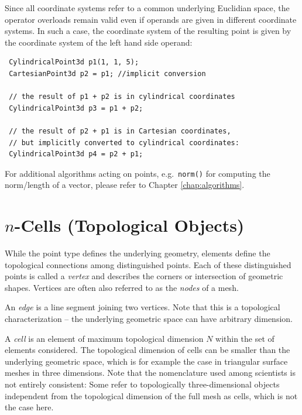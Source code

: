 
Since all coordinate systems refer to a common underlying Euclidian space, the operator overloads remain valid even if operands are given in different coordinate systems. In such a case, the coordinate system of the resulting point is given by the coordinate system of the left hand side operand:
\begin{lstlisting}
 CylindricalPoint3d p1(1, 1, 5);
 CartesianPoint3d p2 = p1; //implicit conversion

 // the result of p1 + p2 is in cylindrical coordinates
 CylindricalPoint3d p3 = p1 + p2;

 // the result of p2 + p1 is in Cartesian coordinates,
 // but implicitly converted to cylindrical coordinates:
 CylindricalPoint3d p4 = p2 + p1;
\end{lstlisting}
For additional algorithms acting on points, e.g.~\lstinline|norm()| for computing the norm/length of a vector, please refer to Chapter \ref{chap:algorithms}.


\section{$n$-Cells (Topological Objects)} \label{sec:ncells}
While the point type defines the underlying geometry, elements define the topological connections among distinguished points. Each of these distinguished points is called a \emph{vertex} and describes the corners or intersection of geometric shapes. Vertices are often also referred to as the \emph{nodes} of a mesh.

An \emph{edge} is a line segment joining two vertices. Note that this is a topological characterization -- the underlying geometric space can have arbitrary dimension.

A \emph{cell} is an element of maximum topological dimension $N$ within the set of elements considered. The topological dimension of cells can be smaller than the underlying geometric space, which is for example the case in triangular surface meshes in three dimensions. Note that the nomenclature used among scientists is not entirely consistent: Some refer to topologically three-dimensional objects independent from the topological dimension of the full mesh as cells, which is not the case here. 

